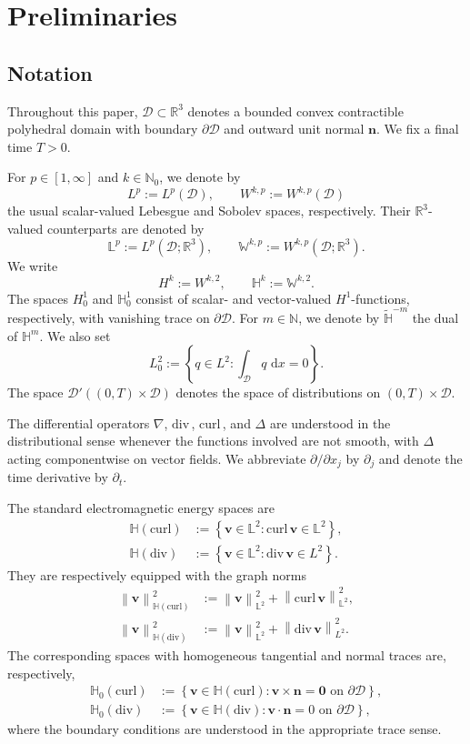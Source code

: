 \documentclass[11pt, reqno]{amsart}
\theoremstyle{definition}
\numberwithin{equation}{section}
\newcommand{\curl}{\mathrm{curl}\,}
\newcommand{\divg}{\mathrm{div}\,}
\newcommand{\bff}{\boldsymbol}
\newcommand{\bb}{\mathbb}
\newcommand{\dx}{\,\mathrm{d}x}
\newcommand{\norm}[2]{\left\|{#1}\right\|_{#2}}
\newcommand{\hdiv}{\mathbb{H}(\mathrm{div})}
\newcommand{\hcurl}{\mathbb{H}(\mathrm{curl})}
\newcommand{\hzerodiv}{\mathbb{H}_0(\mathrm{div})}
\newcommand{\hzerocurl}{\mathbb{H}_0(\mathrm{curl})}
\begin{document}
\section{Preliminaries}

\subsection{Notation}\label{subsec:notation}

Throughout this paper, $\mathscr{D}\subset\mathbb{R}^3$ denotes a bounded convex contractible polyhedral domain with boundary $\partial\mathscr{D}$ and outward unit normal $\bff{n}$. We fix a final time $T>0$.

For $p\in [1,\infty]$ and $k\in\mathbb{N}_0$, we denote by
\[
L^p:=L^p(\mathscr{D}),
\qquad
W^{k,p}:=W^{k,p}(\mathscr{D})
\]
the usual scalar-valued Lebesgue and Sobolev spaces, respectively. Their
$\mathbb{R}^3$-valued counterparts are denoted by
\[
\bb{L}^p:=L^p(\mathscr{D};\mathbb{R}^3),
\qquad
\bb{W}^{k,p}:=W^{k,p}(\mathscr{D};\mathbb{R}^3).
\]
We write
\[
H^k:=W^{k,2},
\qquad
\bb{H}^k:=\bb{W}^{k,2}.
\]
The spaces $H_0^1$ and $\bb{H}_0^1$ consist of scalar- and
vector-valued $H^1$-functions, respectively, with vanishing trace on
$\partial\mathscr{D}$. For $m\in \bb{N}$, we denote by $\widetilde{\bb{H}}^{-m}$ the dual of $\bb{H}^m$. We also set
\[
L_0^2
:=
\left\{
q\in L^2:
\int_{\mathscr{D}}q\,\dx=0
\right\}.
\]
The space $\mathcal D'((0,T)\times\mathscr D)$ denotes the space of distributions on $(0,T)\times\mathscr D$.

The differential operators $\nabla$, $\divg$, $\curl$, and $\Delta$ are
understood in the distributional sense whenever the functions involved are
not smooth, with $\Delta$ acting componentwise on vector fields. We abbreviate
$\partial/\partial x_j$ by $\partial_j$ and denote the time derivative by
$\partial_t$.

The standard electromagnetic energy spaces are
\begin{align*}
\hcurl
&:=
\left\{
\bff{v}\in\bb{L}^2:
\curl\bff{v}\in\bb{L}^2
\right\},
\\
\hdiv 
&:=
\left\{
\bff{v}\in\bb{L}^2:
\divg\bff{v}\in L^2
\right\}.
\end{align*}
They are respectively equipped with the graph norms
\begin{align*}
\norm{\bff{v}}{\hcurl}^2
&:=
\norm{\bff{v}}{\bb{L}^2}^2
+
\norm{\curl\bff{v}}{\bb{L}^2}^2,
\\
\norm{\bff{v}}{\hdiv}^2
&:=
\norm{\bff{v}}{\bb{L}^2}^2
+
\norm{\divg\bff{v}}{L^2}^2.
\end{align*}
The corresponding spaces with homogeneous tangential and normal traces are, respectively,
\begin{align*}
\hzerocurl
&:=
\left\{
\bff{v}\in\hcurl:
\bff{v}\times\bff{n}=\bff{0}
\text{ on }\partial\mathscr{D}
\right\},
\\
\hzerodiv
&:=
\left\{
\bff{v}\in\hdiv:
\bff{v}\cdot\bff{n}=0
\text{ on }\partial\mathscr{D}
\right\},
\end{align*}
where the boundary conditions are understood in the appropriate trace sense.
\end{document}
